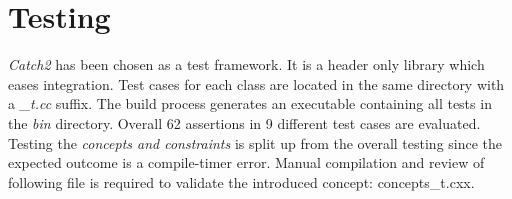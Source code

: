 \section{Testing}

\emph{Catch2}\autocite{Catch} has been chosen as a test framework. It is a header only library which eases integration. Test cases for each class are located in the same directory with a \emph{\_t.cc} suffix. The build process generates an executable containing all tests in the \emph{bin} directory. Overall 62 assertions in 9 different test cases are evaluated. 
Testing the \emph{concepts and constraints} is split up from the overall testing since the expected outcome is a compile-timer error. Manual compilation and review of following file is required to validate the introduced concept: concepts\_t.cxx.
